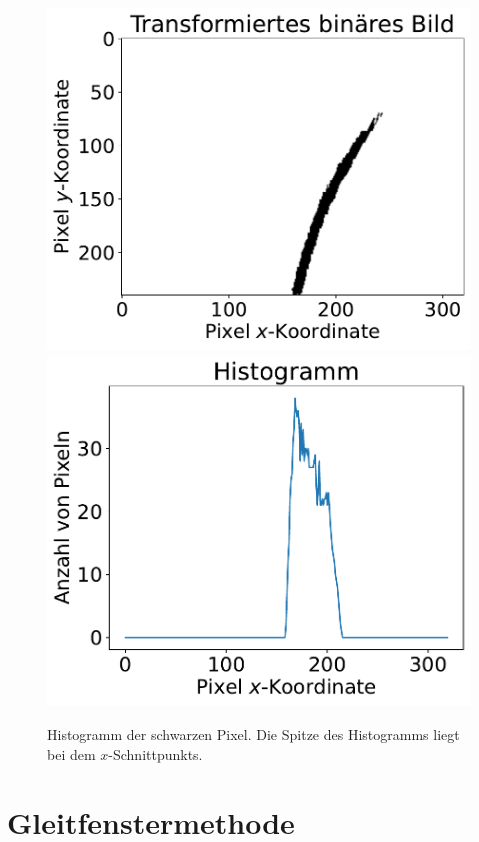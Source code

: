\documentclass[arbeit=studie,oneside,BCOR=12mm]{ArbeitRST}
\begin{document}
\begin{figure}[h]
    \centering
    \includegraphics[scale=0.47]{hist1}
    \includegraphics[scale=0.47]{hist2}
    \caption{Histogramm der schwarzen Pixel. Die Spitze des Histogramms liegt bei dem
    $x$-Schnittpunkts.}
    \label{hist}
\end{figure}

\section{Gleitfenstermethode}
\end{document}

